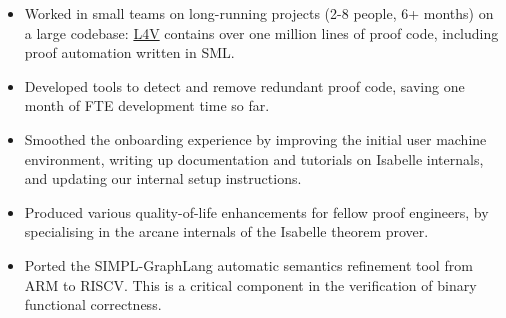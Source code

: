 \documentclass[10pt,a4paper,ragged2e]{altacv}
\begin{document}

\begin{fullwidth}
\makecvheader
\end{fullwidth}



\begin{itemize}
\item Worked in small teams on long-running projects (2-8 people, 6+ months) on a large codebase: \href{https://github.com/seL4/l4v}{L4V} contains over one million lines of proof code, including proof automation written in SML.
\item Developed tools to detect and remove redundant proof code, saving one month of FTE development time so far.
\item Smoothed the onboarding experience by improving the initial user machine environment, writing up documentation and tutorials on Isabelle internals, and updating our internal setup instructions.
\item Produced various quality-of-life enhancements for fellow proof engineers, by specialising in the arcane internals of the Isabelle theorem prover.
\item Ported the SIMPL-GraphLang automatic semantics refinement tool from ARM to RISCV. This is a critical component in the verification of binary functional correctness.
\end{itemize}
\end{document}

